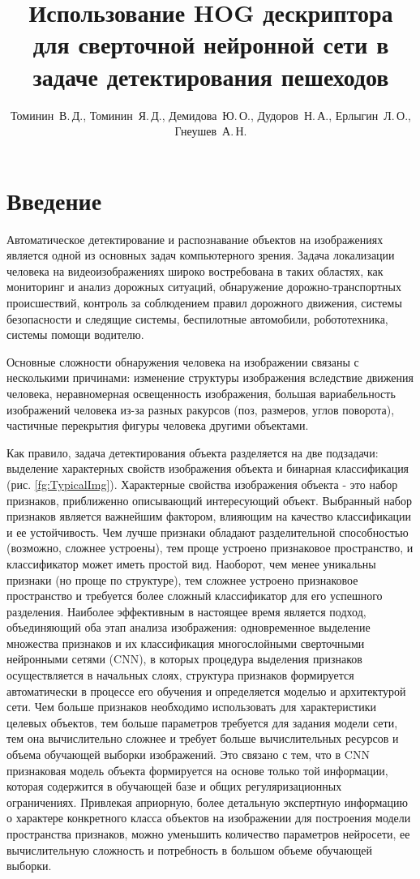 \documentclass[12pt,twoside]{article}
\title
    [HOG дескриптор для сверточной нейронной сети в задаче детектирования пешеходов] %
	{Использование HOG дескриптора для сверточной нейронной сети в задаче детектирования пешеходов}
\author
    [Томинин~В.\,Д., Томинин~Я.\,Д., Демидова~Ю.\,О., Дудоров~Н.\,А., Ерлыгин~Л.\,О.] %
    {Томинин~В.\,Д., Томинин~Я.\,Д., Демидова~Ю.\,О., Дудоров~Н.\,А., Ерлыгин~Л.\,О., Гнеушев~А.\,Н.} %
    [Томинин$^1$~В.\,Д., Томинин$^1$~Я.\,Д., Демидова$^1$~Ю.\,О., Дудоров$^1$~Н.\,А., Ерлыгин$^1$~Л.\,О., Гнеушев$^{1,2}$~А.\,Н.] %
\begin{document}
\maketitle
\section{Введение}
Автоматическое детектирование и распознавание объектов на изображениях является одной из основных задач компьютерного зрения. 
Задача локализации человека на видеоизображениях широко востребована в таких областях, как мониторинг и анализ дорожных ситуаций, обнаружение дорожно-транспортных происшествий, контроль за соблюдением правил дорожного движения, системы безопасности и следящие системы, беспилотные автомобили, робототехника, системы помощи водителю.

Основные сложности обнаружения человека на изображении связаны с несколькими причинами: изменение структуры изображения вследствие движения человека, неравномерная освещенность изображения, большая вариабельность изображений человека из-за разных ракурсов (поз, размеров, углов поворота), частичные перекрытия фигуры человека другими объектами.

Как правило, задача детектирования объекта разделяется на две подзадачи: выделение характерных свойств изображения объекта и бинарная классификация (рис. \ref{fg:TypicalImg}). Характерные свойства изображения объекта - это набор признаков, приближенно описывающий интересующий объект. Выбранный набор признаков является важнейшим фактором, влияющим на качество классификации и ее устойчивость. Чем лучше признаки обладают разделительной способностью (возможно, сложнее устроены), тем проще устроено признаковое пространство, и классификатор может иметь простой вид. Наоборот, чем менее уникальны признаки (но проще по структуре), тем сложнее устроено признаковое пространство и требуется более сложный классификатор для его успешного разделения. Наиболее эффективным в настоящее время является подход, объединяющий оба этап анализа изображения: одновременное выделение множества  признаков и их классификация многослойными сверточными нейронными сетями (CNN), в которых процедура выделения признаков осуществляется в начальных слоях, структура признаков формируется автоматически в процессе его обучения и определяется моделью и архитектурой сети. Чем больше признаков необходимо использовать для характеристики целевых объектов, тем больше параметров требуется для задания модели сети, тем она вычислительно сложнее и требует больше вычислительных ресурсов и объема обучающей выборки изображений. Это связано с тем, что в CNN признаковая модель объекта формируется на основе только той информации, которая содержится в обучающей базе и общих регуляризационных ограничениях. Привлекая априорную, более детальную экспертную информацию о характере конкретного класса объектов на изображении для построения модели пространства признаков, можно уменьшить количество параметров нейросети, ее вычислительную сложность и потребность в большом  объеме обучающей выборки.
\end{document}
